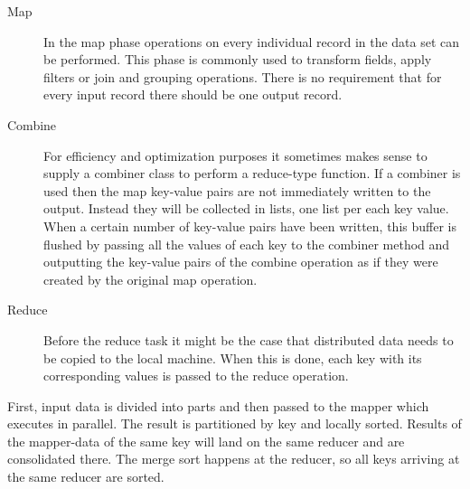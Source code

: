 \begin{description}
  \item[Map] In the map phase operations on every individual record in the data set can be performed. This phase is commonly used to transform fields, apply filters or join and grouping operations. There is no requirement that for every input record there should be one output record.
  \item[Combine] For efficiency and optimization purposes it sometimes makes sense to supply a combiner class to perform a reduce-type function. If a combiner is used then the map key-value pairs are not immediately written to the output. Instead they will be collected in lists, one list per each key value. When a certain number of key-value pairs have been written, this buffer is flushed by passing all the values of each key to the combiner method and outputting the key-value pairs of the combine operation as if they were created by the original map operation.
  \item[Reduce] Before the reduce task it might be the case that distributed data needs to be copied to the local machine. When this is done, each key with its corresponding values is passed to the reduce operation. 
\end{description}

First, input data is divided into parts and then passed to the mapper which executes in parallel. The result is partitioned by key and locally sorted. Results of the mapper-data of the same key will land on the same reducer and are consolidated there. The merge sort happens at the reducer, so all keys arriving at the same reducer are sorted.

